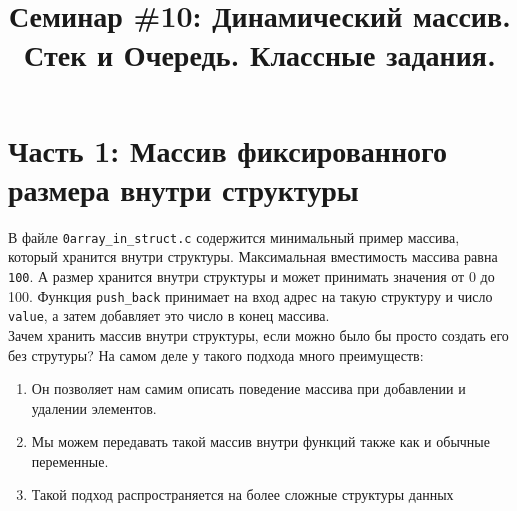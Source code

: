 \documentclass{article}
\begin{document}
\newpage

\title{Семинар \#10: Динамический массив. Стек и Очередь. Классные задания.\vspace{-5ex}}\date{}\maketitle

\section*{Часть 1: Массив фиксированного размера внутри структуры}
В файле \texttt{0array\_in\_struct.c} содержится минимальный пример массива, который хранится внутри структуры. Максимальная вместимость массива равна \texttt{100}. А размер хранится внутри структуры и может принимать значения от 0 до 100. Функция \texttt{push\_back} принимает на вход адрес на такую структуру и число \texttt{value}, а затем добавляет это число в конец массива.\\

Зачем хранить массив внутри структуры, если можно было бы просто создать его без струтуры? На самом деле у такого подхода много преимуществ:
\begin{enumerate}
\item Он позволяет нам самим описать поведение массива при добавлении и удалении элементов.
\item Мы можем передавать такой массив внутри функций также как и обычные переменные.
\item Такой подход распространяется на более сложные структуры данных
\end{enumerate}
\end{document}
